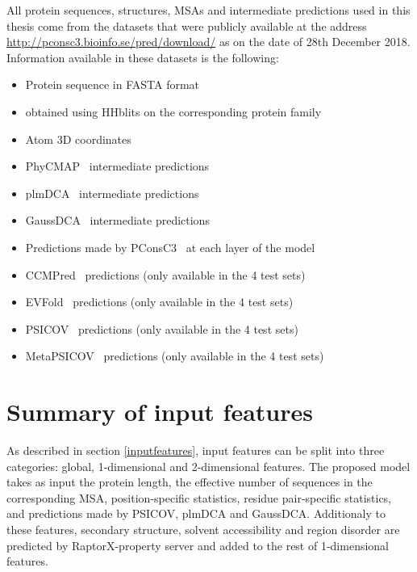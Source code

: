     All protein sequences, structures, MSAs and intermediate predictions used in this thesis come from the datasets that were publicly
    available at the address \url{http://pconsc3.bioinfo.se/pred/download/} as on the date of 28th December 2018.
    Information available in these datasets is the following:


    \begin{itemize}
      \item Protein sequence in FASTA format
      \item {} obtained using HHblits on the corresponding protein family
      \item Atom 3D coordinates
      \item PhyCMAP~\cite{PhyCMap} intermediate predictions
      \item plmDCA~\cite{EKEBERG2014341} intermediate predictions
      \item GaussDCA~\cite{10.1371/journal.pone.0092721} intermediate predictions
      \item Predictions made by PConsC3~\cite{Skwark079673} at each layer of the model
      \item CCMPred~\cite{CCMPred} predictions (only available in the 4 test sets)
      \item EVFold~\cite{Sheridan021022} predictions (only available in the 4 test sets)
      \item PSICOV~\cite{doi:10.1093/bioinformatics/btr638} predictions (only available in the 4 test sets)
      \item MetaPSICOV~\cite{MetaPSICOV} predictions (only available in the 4 test sets)
    \end{itemize}



\section{Summary of input features}

  As described in section \ref{inputfeatures}, input features can be split into three categories:
  global, 1-dimensional and 2-dimensional features.
  The proposed model takes as input the protein length, the effective number of sequences
  in the corresponding MSA, position-specific statistics,
  residue pair-specific statistics, and predictions made by PSICOV, plmDCA and GaussDCA.
  Additionaly to these features, secondary structure, solvent accessibility and
  region disorder are predicted by RaptorX-property server and added to the rest of
  1-dimensional features.

